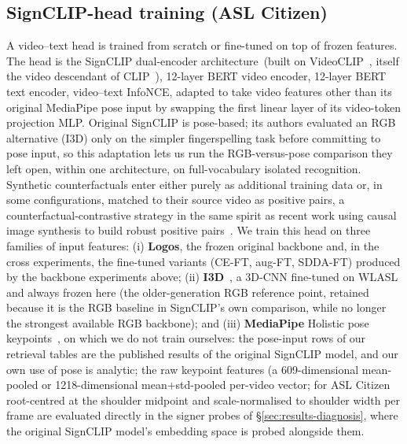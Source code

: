\subsection{SignCLIP-head training (ASL Citizen)}
A video--text head is trained from scratch or fine-tuned on top of
frozen features. The head is the SignCLIP dual-encoder
architecture~\cite{jiangSignCLIPConnectingText2024}(built on
VideoCLIP~\cite{xuVideoCLIPContrastivePretraining2021}, itself the
video descendant of CLIP~\cite{radfordLearningTransferableVisual2021}), 12-layer BERT
video encoder, 12-layer BERT text encoder, video--text InfoNCE,
adapted to take video features other than its original MediaPipe pose
input by swapping the first linear layer of its video-token projection
MLP. Original SignCLIP is pose-based; its authors evaluated an RGB
alternative (I3D) only on the simpler fingerspelling task before
committing to pose input, so this adaptation lets us run the
RGB-versus-pose comparison they left open, within one architecture, on
full-vocabulary isolated recognition. Synthetic counterfactuals enter
either purely as additional training data or, in some configurations,
matched to their source video as positive pairs, a
counterfactual-contrastive strategy in the same spirit as recent work
using causal image synthesis to build robust positive
pairs~\cite{roschewitzCounterfactualContrastiveLearning2025}.
We train this head on three families of input features:
(i) \textbf{Logos}, the frozen original backbone and, in the cross
experiments, the fine-tuned variants (CE-FT, aug-FT, SDDA-FT) produced
by the backbone experiments above; (ii)
\textbf{I3D}~\cite{carreiraQuoVadisAction2017}, a 3D-CNN fine-tuned on
WLASL and always frozen here (the older-generation RGB reference
point, retained because it is the RGB baseline in SignCLIP's own
comparison, while no longer the strongest available RGB backbone); and
(iii) \textbf{MediaPipe} Holistic pose
keypoints~\cite{lugaresiMediaPipeFrameworkBuilding2019}, on which we do
not train ourselves: the pose-input rows of our retrieval tables are the
published results of the original SignCLIP model, and our own use of
pose is analytic; the raw keypoint features (a 609-dimensional
mean-pooled or 1218-dimensional mean+std-pooled per-video vector; for
ASL Citizen root-centred at the shoulder midpoint and scale-normalised
to shoulder width per frame are evaluated directly in the
signer probes of \S\ref{sec:results-diagnosis}, where the original
SignCLIP model's embedding space is probed alongside them.

